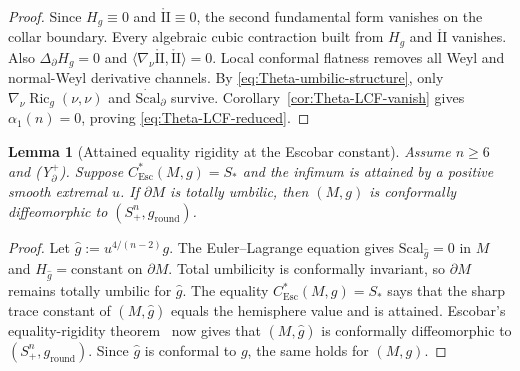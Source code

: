 \documentclass[11pt,reqno,a4paper]{amsart}
\DeclareMathOperator{\Ric}{Ric}
\numberwithin{equation}{section}
\theoremstyle{plain}
\newtheorem{lemma}[theorem]{Lemma}
\newcommand{\Scal}{\mathrm{Scal}}
\newcommand{\Esc}{\ensuremath{\mathrm{Esc}}}
\theoremstyle{remark}
\theoremstyle{plain}
\begin{document}
\begin{proof}
Since $H_g\equiv0$ and $\mathring{\mathrm{II}}\equiv0$, the second fundamental
form vanishes on the collar boundary.  Every algebraic cubic contraction
built from $H_g$ and $\mathring{\mathrm{II}}$ vanishes.
Also $\Delta_\partial H_g=0$ and
$\langle\nabla_\nu\mathring{\mathrm{II}},\mathring{\mathrm{II}}\rangle=0$.
Local conformal flatness removes all Weyl and normal-Weyl derivative channels.
By \eqref{eq:Theta-umbilic-structure}, only
$\nabla_\nu\Ric_g(\nu,\nu)$ and $\dot{\Scal}_\partial$ survive.
Corollary~\ref{cor:Theta-LCF-vanish} gives $\alpha_1(n)=0$, proving
\eqref{eq:Theta-LCF-reduced}.
\end{proof}


\begin{lemma}[Attained equality rigidity at the Escobar constant]
\label{lem:attained-equality-rigidity}
Assume $n\ge6$ and \textup{(Y$^+_{\partial}$)}.  Suppose $C_{\Esc}^*(M,g)=S_\ast$
and the infimum is attained by a positive smooth extremal $u$.  If
$\partial M$ is totally umbilic, then $(M,g)$ is conformally diffeomorphic to
$(S^n_+,g_{\mathrm{round}})$.
\end{lemma}

\begin{proof}
Let $\widehat g:=u^{4/(n-2)}g$.  The Euler--Lagrange equation gives
$\Scal_{\widehat g}=0$ in $M$ and $H_{\widehat g}=\text{constant}$ on
$\partial M$.  Total umbilicity is conformally invariant, so $\partial M$
remains totally umbilic for $\widehat g$.  The equality
$C_{\Esc}^*(M,g)=S_\ast$ says that the sharp trace constant of
$(M,\widehat g)$ equals the hemisphere value and is attained.
Escobar's equality-rigidity theorem~\cite{EscobarJDG92} now gives that
$(M,\widehat g)$ is conformally diffeomorphic to
$(S^n_+,g_{\mathrm{round}})$.  Since $\widehat g$ is conformal to $g$,
the same holds for $(M,g)$.
\end{proof}
\end{document}
